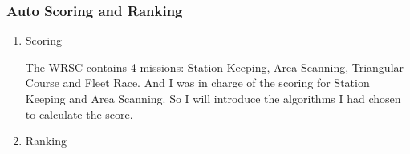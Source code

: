 \subsubsection{Auto Scoring and Ranking}
\begin{enumerate}
\item{Scoring}


The WRSC contains 4 missions: Station Keeping, Area Scanning, Triangular Course and Fleet Race. And I was in charge of the scoring for Station Keeping and Area Scanning. So I will introduce the algorithms I had chosen to calculate the score.
\begin{itemize}


\end{itemize} 
\item{Ranking}
\begin{itemize}


\end{itemize}
\end{enumerate}
